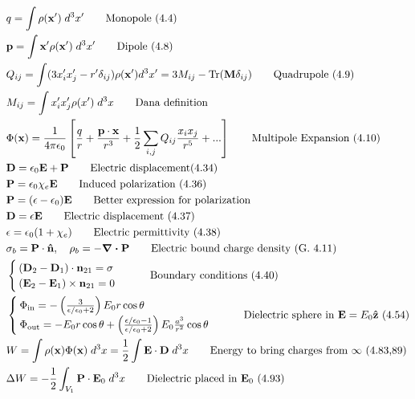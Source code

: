 \documentclass[10pt]{article}
\newcommand{\zhat}{\boldsymbol{\hat{\textbf{z}}}}
\newcommand{\nhat}{\boldsymbol{\hat{\textbf{n}}}}
\newcommand{\ve}[1]{\boldsymbol{\mathbf{#1}}}
\newcommand{\vect}[1]{\boldsymbol{\mathbf{#1}}}
\newcommand{\eo}{\epsilon_0}
\newcommand{\K}{\frac{1}{4 \pi \eo}}
\begin{document}
\begin{multicols}{2}
\begin{align*}
		& q = \int \rho(\vect{x}') \; d^3x'	\tag*{Monopole (4.4)} \\
		& \vect{p} = \int \vect{x}' \rho(\vect{x}') \; d^3x'	\tag*{Dipole (4.8)} \\
		& Q_{ij} = \int (3 x_i' x_j'- r' \delta_{ij})\rho(\vect{x}') d^3x' = 3 M_{ij} - \text{Tr}(\vect{M} \delta_{ij})		\tag*{Quadrupole (4.9)} \\
		& M_{ij} = \int x_i' x_j' \rho(x') \; d^3 x \tag*{Dana definition} \\
		&\Phi(\vect{x}) = \K \left[ \frac{q}{r} + \frac{ \vect{p} \cdot \vect{x}}{r^3} + \frac{1}{2} \sum_{i,j} Q_{ij} \frac{x_i x_j}{r^5} + ... \right] \tag*{Multipole Expansion (4.10)} \\
		& \vect{D} = \eo \vect{E} + \vect{P} \tag*{Electric displacement(4.34)} \\
		& \vect{P} = \eo \chi_e \vect{E} \tag*{Induced polarization (4.36)} \\
		& \ve{P} = (\epsilon - \eo) \ve{E} \tag*{Better expression for polarization} \\
		& \vect{D} = \epsilon \vect{E} \tag*{Electric displacement (4.37)} \\
		& \epsilon = \eo (1 + \chi_e) \tag*{Electric permittivity (4.38)} \\
		& \sigma_b = \ve{P} \cdot \nhat, \quad \rho_b = - \ve{\nabla \cdot P} \tag*{Electric bound charge density (G. 4.11)} \\
		& \begin{cases}
			(\vect{D}_2 - \vect{D}_1) \cdot \vect{n}_{21} = \sigma \\
			(\vect{E}_2 - \vect{E}_1) \times \vect{n}_{21} = 0 \\
		\end{cases}	\tag*{Boundary conditions (4.40)} \\
		&\begin{cases}
			\Phi_{\text{in}} = - \left( \frac{3}{\epsilon/\eo + 2} \right) E_0 r \cos \theta \\ 
			\Phi_{\text{out}} = - E_0 r \cos \theta + \left( \frac{\epsilon/\eo - 1}{\epsilon/\eo + 2} \right) E_0 \frac{a^3}{r^2} \cos \theta 
		\end{cases} \tag*{Dielectric sphere in $\vect{E} = E_0 \zhat$ (4.54)} \\
		& W = \int \rho(\vect{x}) \Phi(\vect{x})\; d^3x = \frac{1}{2} \int \vect{E} \cdot \vect{D} \; d^3x \tag*{Energy to bring charges from $\infty$ (4.83,89)} \\	
		& \Delta W = - \frac{1}{2} \int_{V_1} \vect{P} \cdot \vect{E}_0 \; d^3 x \tag*{Dielectric placed in $\vect{E}_0$ (4.93)} \\

\end{align*}
\end{multicols}
\end{document}
